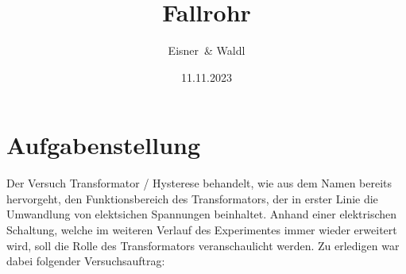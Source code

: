 \documentclass[12pt,a4paper,twoside]{article}
\begin{document}
\newcommand\laboratorynumber{2}
\title{Fallrohr}
\newcommand\supervisor{Ditlbacher, Harald}
\newcommand\groupnumber{42}

\newcommand\participantonelastname{Eisner}
\newcommand\participantonefirstname{Nico}
\newcommand\participantoneid{12214121}
\newcommand\participanttwolastname{Waldl}
\newcommand\participanttwofirstname{Philip}
\newcommand\participanttwoid{12214120}
\author{\participantonelastname \ \& \participanttwolastname}

\newcommand\degreeid{UB 033 678}
\newcommand\semester{23WS}
\date{11.11.2023}

\newcommand\coursetitle{Laborübungen 2: \\ Elektrizität, Magnetismus, Optik}

%



\tableofcontents
\newpage

\section{Aufgabenstellung} %
Der Versuch Transformator / Hysterese behandelt, wie aus dem Namen bereits hervorgeht, den Funktionsbereich des Transformators, der in erster Linie die Umwandlung von elektsichen Spannungen beinhaltet.
Anhand einer elektrischen Schaltung, welche im weiteren Verlauf des Experimentes immer wieder erweitert wird, soll die Rolle des Transformators veranschaulicht werden.
Zu erledigen war dabei folgender Versuchsauftrag:
\end{document}

